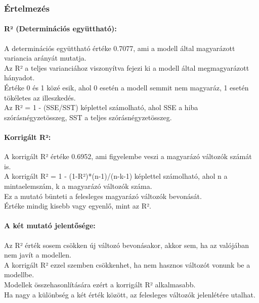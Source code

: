 \documentclass[11pt]{article}
\begin{document}
    \subsubsection{Értelmezés}\label{uxe9rtelmezuxe9s}

\paragraph{R² (Determinációs
együttható):}\label{ruxb2-determinuxe1ciuxf3s-egyuxfctthatuxf3}

A determinációs együttható értéke 0.7077, ami a modell által magyarázott
variancia arányát mutatja.\\
Az R² a teljes varianciához viszonyítva fejezi ki a modell által
megmagyarázott hányadot.\\
Értéke 0 és 1 közé esik, ahol 0 esetén a modell semmit nem magyaráz, 1
esetén tökéletes az illeszkedés.\\
Az R² = 1 - (SSE/SST) képlettel számolható, ahol SSE a hiba
szórásnégyzetösszeg, SST a teljes szórásnégyzetösszeg.

\paragraph{Korrigált R²:}\label{korriguxe1lt-ruxb2}

A korrigált R² értéke 0.6952, ami figyelembe veszi a magyarázó változók
számát is.\\
A korrigált R² = 1 - (1-R²)*(n-1)/(n-k-1) képlettel számolható, ahol n a
mintaelemszám, k a magyarázó változók száma.\\
Ez a mutató bünteti a felesleges magyarázó változók bevonását.\\
Értéke mindig kisebb vagy egyenlő, mint az R².

\paragraph{A két mutató
jelentősége:}\label{a-kuxe9t-mutatuxf3-jelentux151suxe9ge}

Az R² érték sosem csökken új változó bevonásakor, akkor sem, ha az
valójában nem javít a modellen.\\
A korrigált R² ezzel szemben csökkenhet, ha nem hasznos változót vonunk
be a modellbe.\\
Modellek összehasonlítására ezért a korrigált R² alkalmasabb.\\
Ha nagy a különbség a két érték között, az felesleges változók
jelenlétére utalhat.
\end{document}
